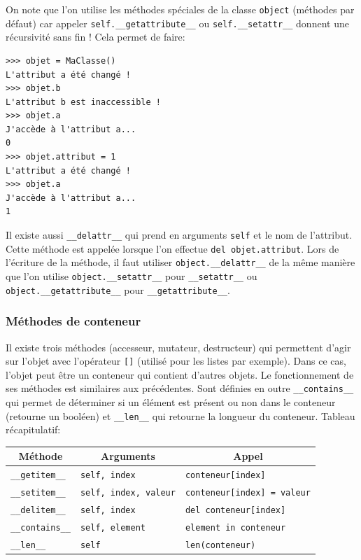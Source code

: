 \documentclass[a4paper, 10pt]{article}
\newcommand{\code}[1]{{\small\texttt{#1}}}
\begin{document}
On note que l'on utilise les méthodes spéciales de la classe \code{object} (méthodes par défaut) car appeler \code{self.\_\_getattribute\_\_} ou \code{self.\_\_setattr\_\_} donnent une récursivité sans fin ! Cela permet de faire:
\begin{Verbatim}[fontsize = \footnotesize, frame = single]
>>> objet = MaClasse()
L'attribut a été changé !
>>> objet.b
L'attribut b est inaccessible !
>>> objet.a
J'accède à l'attribut a...
0
>>> objet.attribut = 1
L'attribut a été changé !
>>> objet.a
J'accède à l'attribut a...
1
\end{Verbatim}
Il existe aussi \code{\_\_delattr\_\_}\index{\code{\_\_delattr\_\_}} qui prend en arguments \code{self} et le nom de l'attribut. Cette méthode est appelée lorsque l'on effectue \code{del objet.attribut}. Lors de l'écriture de la méthode, il faut utiliser \code{object.\_\_delattr\_\_} de la même manière que l'on utilise \code{object.\_\_setattr\_\_} pour \code{\_\_setattr\_\_} ou \code{object.\_\_getattribute\_\_} pour \code{\_\_getattribute\_\_}.\bigskip

\subsubsection{Méthodes de conteneur}
Il existe trois méthodes (accesseur, mutateur, destructeur) qui permettent d'agir sur l'objet avec l'opérateur \code{[]} (utilisé pour les listes par exemple). Dans ce cas, l'objet peut être un conteneur qui contient d'autres objets. Le fonctionnement de ses méthodes est similaires aux précédentes. Sont définies en outre \code{\_\_contains\_\_}\index{\code{\_\_contains\_\_}} qui permet de déterminer si un élément est présent ou non dans le conteneur (retourne un booléen) et \code{\_\_len\_\_}\index{\code{\_\_len\_\_}} qui retourne la longueur du conteneur. Tableau récapitulatif:
\begin{center}
        \begin{tabular}{|p{2.5cm}|p{3.5 cm}|p{5cm}|}
        \hline
        \multicolumn{1}{|c}{\bf Méthode} & \multicolumn{1}{|c}{\bf Arguments} & \multicolumn{1}{|c|}{\bf Appel} \\
        \hline
        \code{\_\_getitem\_\_} & \code{self, index} & \code{conteneur[index]}\\
        \hline
        \code{\_\_setitem\_\_} & \code{self, index, valeur} & \code{conteneur[index] = valeur}\\
        \hline
        \code{\_\_delitem\_\_} & \code{self, index} & \code{del conteneur[index]}\\
        \hline
        \code{\_\_contains\_\_} & \code{self, element} & \code{element in conteneur}\\
        \hline
        \code{\_\_len\_\_} & \code{self} & \code{len(conteneur)}\\
        \hline
\end{tabular}
\end{center}
\end{document}
